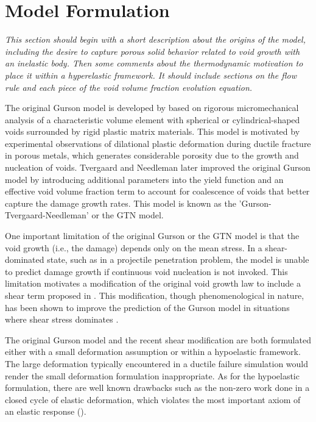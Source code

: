 \chapter{Model Formulation}
\label{model-form}

\textit{This section should begin with a short description about the
  origins of the model, including the desire to capture porous solid
  behavior related to void growth with an inelastic body. Then some
  comments about the thermodynamic motivation to place it within a
  hyperelastic framework. It should include sections on the flow rule
  and each piece of the void volume fraction evolution equation.}

The original Gurson model is developed by \cite{Gurson1977} based on rigorous micromechanical analysis of a characteristic volume element with spherical or cylindrical-shaped voids surrounded by rigid plastic matrix materials. This model is motivated by experimental observations of dilational plastic deformation during ductile fracture in porous metals, which generates considerable porosity due to the growth and nucleation of voids. Tvergaard and Needleman \cite{Tvergaard1984} later improved the original Gurson model by introducing additional parameters into the yield function and an effective void volume fraction term to account for coalescence of voids that better capture the damage growth rates. This model is known as the 'Gurson-Tvergaard-Needleman' or the GTN model.

One important limitation of the original Gurson or the GTN model is that the void growth (i.e., the damage) depends only on the mean stress. In a shear-dominated state, such as in a projectile penetration problem, the model is unable to predict damage growth if continuous void nucleation is not invoked. This limitation motivates a modification of the original void growth law to include a shear term proposed in \cite{Nahshon2008}. This modification, though phenomenological in nature, has been shown to improve the prediction of the Gurson model in situations where shear stress dominates \cite{Nahshon2008,Nahshon2009}. 

The original Gurson model and the recent shear modification are both formulated either with a small deformation assumption or within a hypoelastic framework. The large deformation typically encountered in a ductile failure simulation would render the small deformation formulation inappropriate. As for the hypoelastic formulation, there are well known drawbacks such as the non-zero work done in a closed cycle of elastic deformation, which violates the most important axiom of an elastic response (\cite{Belytschko2013}).

